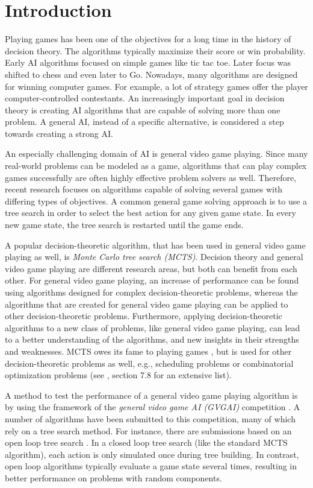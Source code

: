 \chapter{Introduction}
\label{sec:introduction}

Playing games has been one of the objectives for a long time in the history of
decision theory. The algorithms typically maximize their score or win
probability. Early AI algorithms focused on simple games like tic tac toe.
Later focus was shifted to chess and even later to Go. Nowadays, many algorithms
are designed for winning computer games. For example, a lot of strategy games
offer the player computer-controlled contestants.  An increasingly important
goal in decision theory is creating AI algorithms that are capable of solving
more than one problem. A general AI, instead of a specific alternative, is
considered a step towards creating a strong AI.

An especially challenging domain of AI is general video game playing.  Since
many real-world problems can be modeled as a game, algorithms that can play
complex games successfully are often highly effective problem solvers as well.
Therefore, recent research focuses on algorithms capable of solving several
games with differing types of objectives. A common general game solving approach
is to use a tree search in order to select the best action for any given game
state. In every new game state, the tree search is restarted until the game
ends. 

A popular decision-theoretic algorithm, that has been used in general video game
playing as well, is \emph{Monte Carlo tree search (MCTS)}. Decision theory and
general video game playing are different research areas, but both can benefit
from each other. For general video game playing, an increase of performance can
be found using algorithms designed for complex decision-theoretic problems,
whereas the algorithms that are created for general video game playing can be
applied to other decision-theoretic problems.  Furthermore, applying
decision-theoretic algorithms to a new class of problems, like general video
game playing, can lead to a better understanding of the algorithms, and new
insights in their strengths and weaknesses.  MCTS owes its fame to playing games
\cite{gelly2006modification}, but is used for other decision-theoretic problems
as well, e.g., scheduling problems or combinatorial optimization problems (see
\cite{browne2012survey}, section 7.8 for an extensive list). 

A method to test the performance of a general video game playing algorithm is
by using the framework of the \emph{general video game AI (GVGAI)} competition
\cite{perez2014}.  A number of algorithms have been submitted to this competition,
many of which rely on a tree search method. For instance, there are submissions
based on an open loop tree search \cite{perez2015open}.
In a closed loop tree search (like the standard MCTS algorithm), each action is
only simulated once during tree building. In contrast, open loop algorithms
typically evaluate a game state several times, resulting in better performance
on problems with random components.

